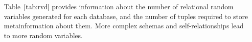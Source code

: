 \documentclass{acm_proc_article-sp}
\begin{document}
\begin{table}[hbtp] \centering
\caption{Datasets characteristics. \#Tuples = total number of tuples over all tables in the dataset. 
  \label{table:datasetsize}}
\end{table}

Table~\ref{tab:rvd} provides information about the number of relational random variables generated for each database, and the number of tuples required to store metainformation about them. More complex schemas and self-relationships lead to more random variables. 
%
\end{document}

